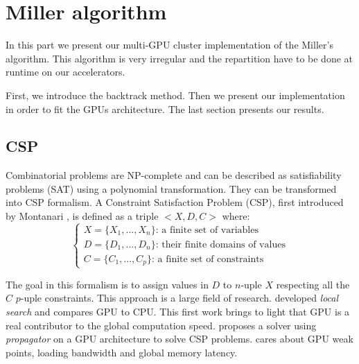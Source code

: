 \section{Miller algorithm}

In this part we present our multi-GPU cluster implementation of the Miller's algorithm. 
This algorithm is very irregular and the repartition have to be done at runtime on our accelerators. 

First, we introduce the backtrack method. 
Then we present our implementation in order to fit the GPUs architecture. 
The last section presents our results. 

\subsection{CSP}

Combinatorial problems are NP-complete \cite{GJ79} and can be described as satisfiability problems (SAT) using a polynomial transformation. 
They can be transformed into CSP formalism.
A Constraint Satisfaction Problem (CSP), first introduced by Montanari \cite{Mon74}, is defined as a triple $<X,D,C>$ where:
\begin{equation}
\begin{cases}
X=\{X_1,...,X_n\}\text{: a finite set of variables} \\ 
D=\{D_1,...,D_n\}\text{: their finite domains of values}\\
C=\{C_1,...,C_p\}\text{: a finite set of constraints}
\end{cases}
\end{equation}

The goal in this formalism is to assign values in $D$ to $n$-uple $X$ respecting all the $C$ $p$-uple constraints.
This approach is a large field of research. \cite{arbelaez2014gpu} developed \textit{local search} and compares GPU to CPU. 
This first work brings to light that GPU is a real contributor to the global computation speed. \cite{campeotto2014exploring} proposes a solver using \textit{propagator} on a GPU architecture to solve CSP problems. 
\cite{jenkins2011lessons} cares about GPU weak points, loading bandwidth and global memory latency.


